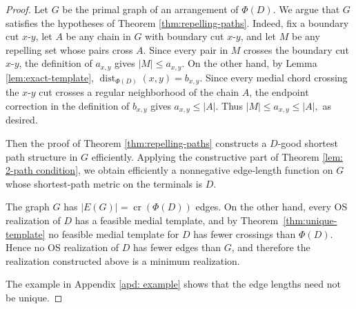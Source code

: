 \documentclass[11pt]{article}
\begin{document}
\begin{proof}
Let $G$ be the primal graph of an arrangement of $\Phi(D)$. We argue
that $G$ satisfies the hypotheses of Theorem \ref{thm:repelling-paths}. Indeed, fix a boundary cut $x$-$y$, let $A$ be any chain in $G$ with boundary
cut $x$-$y$, and let $M$ be any repelling set whose pairs cross $A$. 
Since every pair in $M$ crosses the boundary cut $x$-$y$, the definition of
$a_{x,y}$ gives $|M|\leq a_{x,y}$. On the other hand, by Lemma \ref{lem:exact-template},
$\operatorname{dist}_{\Phi(D)}(x,y)=b_{x,y}$. Since every medial chord
crossing the $x$-$y$ cut crosses a regular neighborhood of the chain $A$,
the endpoint correction in the definition of $b_{x,y}$ gives
$a_{x,y}\leq |A|$. Thus
$
|M|\leq a_{x,y}\leq |A|,
$
as desired.

Then the proof of Theorem \ref{thm:repelling-paths} constructs a $D$-good shortest path structure in $G$
efficiently. Applying the constructive part of Theorem \ref{lem: 2-path condition}, we obtain
efficiently a nonnegative edge-length function on $G$ whose shortest-path
metric on the terminals is $D$.

The graph $G$ has $|E(G)|=\operatorname{cr}(\Phi(D))$ edges. On the
other hand, every OS realization of $D$ has a feasible medial template,
and by Theorem~\ref{thm:unique-template} no feasible medial template for
$D$ has fewer crossings than $\Phi(D)$. Hence no OS realization of $D$
has fewer edges than $G$, and therefore the realization constructed above
is a minimum realization.

The example in Appendix \ref{apd: example} shows that the edge lengths need not be unique.
\end{proof}

\end{document}
